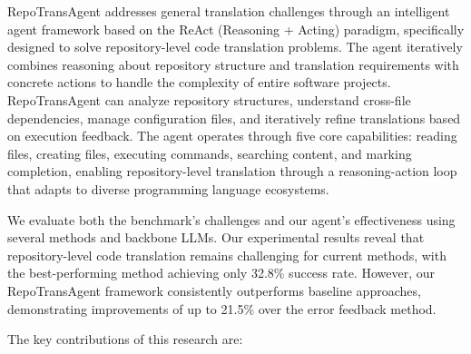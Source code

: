RepoTransAgent addresses general translation challenges through an intelligent agent framework based on the ReAct (Reasoning + Acting) paradigm, specifically designed to solve repository-level code translation problems. The agent iteratively combines reasoning about repository structure and translation requirements with concrete actions to handle the complexity of entire software projects. 
RepoTransAgent can analyze repository structures, understand cross-file dependencies, manage configuration files, and iteratively refine translations based on execution feedback. The agent operates through five core capabilities: reading files, creating files, executing commands, searching content, and marking completion, enabling repository-level translation through a reasoning-action loop that adapts to diverse programming language ecosystems.

We evaluate both the benchmark's challenges and our agent's effectiveness using several methods and backbone LLMs. Our experimental results reveal that repository-level code translation remains challenging for current methods, with the best-performing method achieving only 32.8\% success rate. However, our RepoTransAgent framework consistently outperforms baseline approaches, demonstrating improvements of up to 21.5\% over the error feedback method.

The key contributions of this research are:



